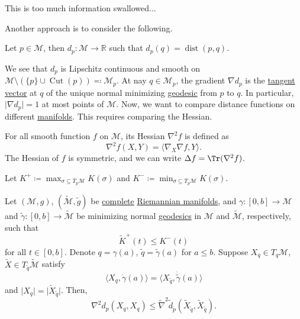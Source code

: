 \begin{note}
	This is too much information swallowed...
\end{note}

Another approach is to consider the following.

\begin{notation}
	Let \(p\in \mathcal{M} \), then \(d_p \colon \mathcal{M} \to \mathbb{R} \) such that \(d_p(q) = \mathop{\mathrm{dist}}(p, q) \).
\end{notation}

We see that \(d_p\) is Lipschitz continuous and smooth on \(\mathcal{M} \setminus (\{ p \} \cup \mathop{\mathrm{Cut}}(p) ) \eqqcolon \mathcal{M} _p\). At nay \(q\in \mathcal{M} _p\), the gradient \(\nabla d_p\) is the \hyperref[def:tangent-vector]{tangent vector} at \(q\) of the unique normal minimizing \hyperref[def:geodesic]{geodesic} from \(p\) to \(q\). In particular, \(\vert \nabla d_p \vert = 1\) at most points of \(\mathcal{M} \). Now, we want to compare distance functions on different \hyperref[def:smooth-manifold]{manifolds}. This requires comparing the Hessian.

\begin{prev}[Hessian]
	For all smooth function \(f\) on \(\mathcal{M} \), its Hessian \(\nabla ^2 f\) is defined as
	\[
		\nabla ^2 f(X, Y) = \langle \nabla _X \nabla f, Y \rangle.
	\]
	The Hessian of \(f\) is symmetric, and we can write \(\Delta f = \Tr (\nabla ^2 f)\).
\end{prev}

\begin{notation}
	Let \(K^+ \coloneqq \max _{\sigma \subseteq T_p \mathcal{M} } K(\sigma )\) and \(K^- \coloneqq \min _{\sigma \subseteq T_p \mathcal{M} } K(\sigma )\).
\end{notation}

\begin{theorem}\label{thm:comparsion-Hessian}
	Let \((\mathcal{M} , g)\), \((\widetilde{\mathcal{M}} , \widetilde{g} )\) be \hyperref[def:geodesically-complete]{complete} \hyperref[def:Riemannian-manifold]{Riemannian manifolds}, and \(\gamma \colon [0, b] \to \mathcal{M} \) and \(\widetilde{\gamma} \colon [0, b] \to \widetilde{\mathcal{M}} \) be minimizing normal \hyperref[def:geodesic]{geodesics} in \(\mathcal{M} \) and \(\widetilde{\mathcal{M}} \), respectively, such that
	\[
		\widetilde{K} ^+ (t)\leq K^-(t)
	\]
	for all \(t\in [0, b]\). Denote \(q = \gamma (a)\), \(\widetilde{q} = \widetilde{\gamma} (a)\) for \(a \leq b\). Suppose \(X_q\in T_q \mathcal{M}\), \(\widetilde{X} \in T_{\widetilde{q} } \widetilde{\mathcal{M}} \) satisfy
	\[
		\langle X_q, \dot{\gamma } (a) \rangle = \langle X_{\widetilde{q} }, \dot{\widetilde{\gamma} } (a) \rangle
	\]
	and \(\vert X_q \vert = \vert \widetilde{X} _{\widetilde{q} } \vert \). Then,
	\[
		\nabla ^2 d_p(X_q, X_q) \leq \widetilde{\nabla} ^2 \widetilde{d} _{\widetilde{p} } (\widetilde{X} _{\widetilde{q} }, \widetilde{X} _{\widetilde{q} }).
	\]
\end{theorem}

